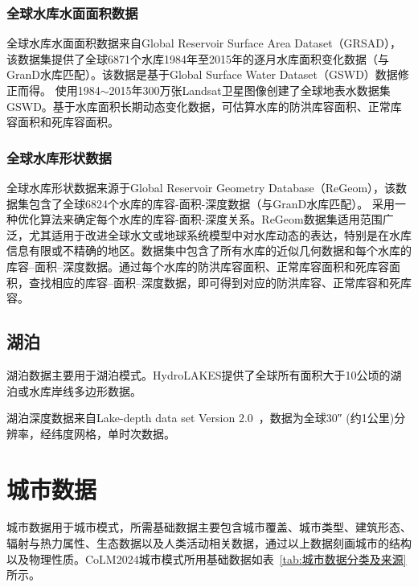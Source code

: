 \subsubsection{全球水库水面面积数据}
全球水库水面面积数据来自Global Reservoir Surface Area Dataset（GRSAD），该数据集提供了全球6871个水库1984年至2015年的逐月水库面积变化数据（与GranD水库匹配）。该数据是基于Global Surface Water Dataset（GSWD）数据修正而得。\citet{pekel2016high} 使用1984$\sim$2015年300万张Landsat卫星图像创建了全球地表水数据集GSWD。基于水库面积长期动态变化数据，可估算水库的防洪库容面积、正常库容面积和死库容面积。


\subsubsection{全球水库形状数据}

全球水库形状数据来源于Global Reservoir Geometry Database（ReGeom），该数据集包含了全球6824个水库的库容-面积-深度数据（与GranD水库匹配）。\citet{yigzaw2018new} 采用一种优化算法来确定每个水库的库容-面积-深度关系。ReGeom数据集适用范围广泛，尤其适用于改进全球水文或地球系统模型中对水库动态的表达，特别是在水库信息有限或不精确的地区。数据集中包含了所有水库的近似几何数据和每个水库的库容--面积--深度数据。通过每个水库的防洪库容面积、正常库容面积和死库容面积，查找相应的库容--面积--深度数据，即可得到对应的防洪库容、正常库容和死库容。


\subsection{湖泊}
湖泊数据主要用于湖泊模式。HydroLAKES提供了全球所有面积大于10公顷的湖泊或水库岸线多边形数据\citep{messager2016nc}。

湖泊深度数据来自Lake-depth data set Version 2.0~\citep{kourzeneva2012global}，数据为全球\ang{;;30} (约1公里)分辨率，经纬度网格，单时次数据。


\section{城市数据}\label{城市数据}

城市数据用于城市模式，所需基础数据主要包含城市覆盖、城市类型、建筑形态、辐射与热力属性、生态数据以及人类活动相关数据，通过以上数据刻画城市的结构以及物理性质。CoLM2024城市模式所用基础数据如表~\ref{tab:城市数据分类及来源} 所示。


